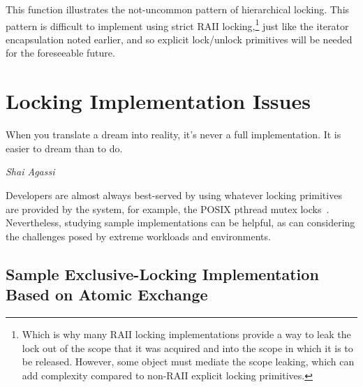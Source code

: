 
This function illustrates the not-uncommon pattern of hierarchical
locking.
This pattern is difficult to implement using strict RAII locking,\footnote{
	Which is why many RAII locking implementations provide a way
	to leak the lock out of the scope that it was acquired and into
	the scope in which it is to be released.
	However, some object must mediate the scope leaking, which can
	add complexity compared to non-RAII explicit locking primitives.}
just like the iterator encapsulation noted earlier,
and so explicit lock/unlock primitives will be needed for the foreseeable
future.

\section{Locking Implementation Issues}
\label{sec:locking:Locking Implementation Issues}
%
\epigraph{When you translate a dream into reality, it's never a full
	  implementation.  It is easier to dream than to do.}
	 {\emph{Shai Agassi}}

Developers are almost always best-served by using whatever locking
primitives are provided by the system, for example, the POSIX
pthread mutex locks~\cite{OpenGroup1997pthreads,Butenhof1997pthreads}.
Nevertheless, studying sample implementations can be helpful,
as can considering the challenges posed by extreme workloads and
environments.

\subsection{Sample Exclusive-Locking Implementation Based on Atomic Exchange}
\label{sec:locking:Sample Exclusive-Locking Implementation Based on Atomic Exchange}

